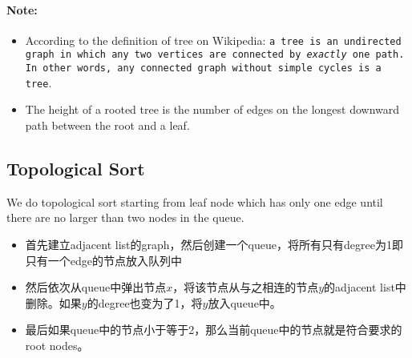 \paragraph{Note:}

\begin{itemize}
\item According to the definition of tree on Wikipedia: \texttt{a tree is an undirected graph in which any two vertices are connected by \textit{exactly} one path. In other words, any connected graph without simple cycles is a tree}.
\item The height of a rooted tree is the number of edges on the longest downward path between the root and a leaf.
\end{itemize}
\subsection{Topological Sort}
We do topological sort starting from leaf node which has only one edge until there are no larger than two nodes in the queue. 
\begin{itemize}
\item 首先建立adjacent list的graph，然后创建一个queue，将所有只有degree为1即只有一个edge的节点放入队列中
\item 然后依次从queue中弹出节点$x$，将该节点从与之相连的节点$y$的adjacent list中删除。如果$y$的degree也变为了1，将$y$放入queue中。
\item 最后如果queue中的节点小于等于2，那么当前queue中的节点就是符合要求的root nodes。
\end{itemize}
\setcounter{lstlisting}{0}
